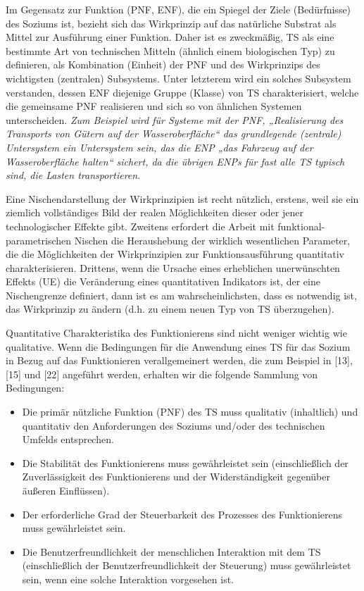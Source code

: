 \documentclass[11pt,a4paper]{article}
\begin{document}
Im Gegensatz zur Funktion (PNF, ENF), die ein Spiegel der Ziele (Bedürfnisse)
des Soziums ist, bezieht sich das Wirkprinzip auf das natürliche Substrat als
Mittel zur Ausführung einer Funktion.  Daher ist es zweckmäßig, TS als eine
bestimmte Art von technischen Mitteln (ähnlich einem biologischen Typ) zu
definieren, als Kombination (Einheit) der PNF und des Wirkprinzips des
wichtigsten (zentralen) Subsystems. Unter letzterem wird ein solches Subsystem
verstanden, dessen ENF diejenige Gruppe (Klasse) von TS charakterisiert,
welche die gemeinsame PNF realisieren und sich so von ähnlichen Systemen
unterscheiden.  \emph{Zum Beispiel wird für Systeme mit der PNF, „Realisierung
  des Transports von Gütern auf der Wasseroberfläche“ das grundlegende
  (zentrale) Untersystem ein Untersystem sein, das die ENP „das Fahrzeug auf
  der Wasseroberfläche halten“ sichert, da die übrigen ENPs für fast alle TS
  typisch sind, die Lasten transportieren}.

Eine Nischendarstellung der Wirkprinzipien ist recht nützlich, erstens, weil
sie ein ziemlich vollständiges Bild der realen Möglichkeiten dieser oder jener
technologischer Effekte gibt.  Zweitens erfordert die Arbeit mit
funktional-parametrischen Nischen die Heraushebung der wirklich wesentlichen
Parameter, die die Möglichkeiten der Wirkprinzipien zur Funktionsausführung
quantitativ charakterisieren. Drittens, wenn die Ursache eines erheblichen
unerwünschten Effekts (UE) die Veränderung eines quantitativen Indikators ist,
der eine Nischengrenze definiert, dann ist es am wahrscheinlichsten, dass es
notwendig ist, das Wirkprinzip zu ändern (d.h. zu einem neuen Typ von TS
überzugehen).

Quantitative Charakteristika des Funktionierens sind nicht weniger wichtig wie
qualitative.  Wenn die Bedingungen für die Anwendung eines TS für das Sozium
in Bezug auf das Funktionieren verallgemeinert werden, die zum Beispiel in
[13], [15] und [22] angeführt werden, erhalten wir die folgende Sammlung von
Bedingungen:
\begin{itemize}[noitemsep]
\item Die primär nützliche Funktion (PNF) des TS muss qualitativ (inhaltlich)
  und quantitativ den Anforderungen des Soziums und/oder des technischen
  Umfelds entsprechen.
\item Die Stabilität des Funktionierens muss gewährleistet sein
  (einschließlich der Zuverlässig\-keit des Funktionierens und der
  Widerständigkeit gegenüber äußeren Einflüssen).
\item Der erforderliche Grad der Steuerbarkeit des Prozesses des
  Funktionierens muss gewähr\-leistet sein.
\item Die Benutzerfreundlichkeit der menschlichen Interaktion mit dem TS
  (einschließlich der Benutzerfreundlichkeit der Steuerung) muss gewährleistet
  sein, wenn eine solche Interaktion vorgesehen ist.
\end{itemize}
\end{document}
